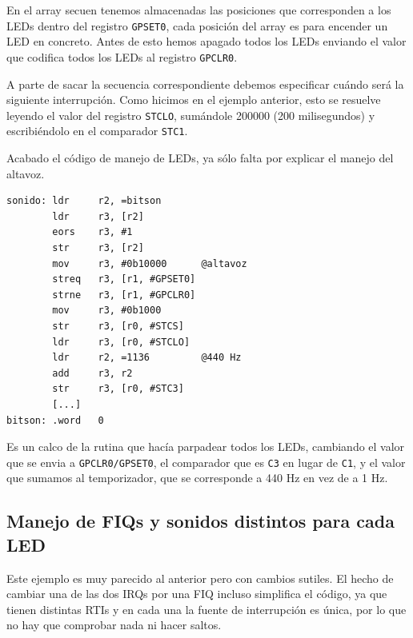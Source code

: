 En el array secuen tenemos almacenadas las posiciones que corresponden a los LEDs dentro del
registro {\tt GPSET0}, cada posición del array es para encender un LED en concreto. Antes
de esto hemos apagado todos los LEDs enviando el valor que codifica todos los LEDs al
registro {\tt GPCLR0}.

A parte de sacar la secuencia correspondiente debemos especificar cuándo será la siguiente
interrupción. Como hicimos en el ejemplo anterior, esto se resuelve leyendo el valor del
registro {\tt STCLO}, sumándole 200000 (200 milisegundos) y escribiéndolo en el comparador
{\tt STC1}.

Acabado el código de manejo de LEDs, ya sólo falta por explicar el manejo del altavoz.

\begin{lstlisting}
sonido: ldr     r2, =bitson
        ldr     r3, [r2]
        eors    r3, #1
        str     r3, [r2]
        mov     r3, #0b10000      @altavoz
        streq   r3, [r1, #GPSET0]
        strne   r3, [r1, #GPCLR0]
        mov     r3, #0b1000
        str     r3, [r0, #STCS]
        ldr     r3, [r0, #STCLO]
        ldr     r2, =1136         @440 Hz
        add     r3, r2
        str     r3, [r0, #STC3]
        [...]
bitson: .word   0
\end{lstlisting}

Es un calco de la rutina que hacía parpadear todos los LEDs, cambiando
el valor que se envia a {\tt GPCLR0/GPSET0}, el comparador que es {\tt C3} en lugar de {\tt C1},
y el valor que sumamos al temporizador, que se corresponde a 440 Hz en vez de a 1 Hz.

\subsection{Manejo de FIQs y sonidos distintos para cada LED}

Este ejemplo es muy parecido al anterior pero con cambios sutiles. El hecho de cambiar una de
las dos IRQs por una FIQ incluso simplifica el código, ya que tienen distintas RTIs y en cada
una la fuente de interrupción es única, por lo que no hay que comprobar nada ni hacer saltos.

